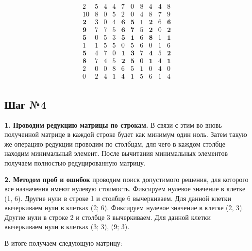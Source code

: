 \documentclass[17pt]{extarticle}
\begin{document}
\[
    \begin{array}{*{10}{c}}
        2          & 5 & 4 & 4 & 7          & 0          & 8 & 4          & 4 & 8          \\
        10         & 8 & 0 & 5 & 2          & 0          & 4 & 8          & 7 & 9          \\
        \textbf{2} & 3 & 0 & 4 & \textbf{6} & \textbf{5} & 1 & \textbf{2} & 6 & \textbf{6} \\
        \textbf{9} & 7 & 7 & 5 & \textbf{6} & \textbf{7} & 5 & \textbf{2} & 0 & \textbf{2} \\
        \textbf{5} & 0 & 5 & 3 & \textbf{5} & \textbf{1} & 6 & \textbf{8} & 1 & \textbf{1} \\
        1          & 1 & 5 & 5 & 0          & 5          & 6 & 0          & 1 & 6          \\
        \textbf{5} & 4 & 7 & 0 & \textbf{1} & \textbf{3} & 7 & \textbf{4} & 5 & \textbf{2} \\
        \textbf{8} & 7 & 4 & 5 & \textbf{2} & \textbf{5} & 0 & \textbf{1} & 4 & \textbf{1} \\
        2          & 0 & 0 & 8 & 6          & 5          & 1 & 0          & 4 & 0          \\
        0          & 2 & 4 & 1 & 4          & 1          & 5 & 6          & 1 & 4          \\
    \end{array}
\]

\subsection*{Шаг №4}

\textbf{1. Проводим редукцию матрицы по строкам.} В связи с этим во вновь полученной матрице в каждой строке будет как минимум один ноль.
Затем такую же операцию редукции проводим по столбцам, для чего в каждом столбце находим минимальный элемент.
После вычитания минимальных элементов получаем полностью редуцированную матрицу.

\textbf{2. Методом проб и ошибок} проводим поиск допустимого решения, для которого все назначения имеют нулевую стоимость.
Фиксируем нулевое значение в клетке (1, 6). Другие нули в строке 1 и столбце 6 вычеркиваем. Для данной клетки вычеркиваем нули в клетках (2; 6).
Фиксируем нулевое значение в клетке (2, 3). Другие нули в строке 2 и столбце 3 вычеркиваем. Для данной клетки вычеркиваем нули в клетках (3; 3), (9; 3).

В итоге получаем следующую матрицу:
\end{document}
